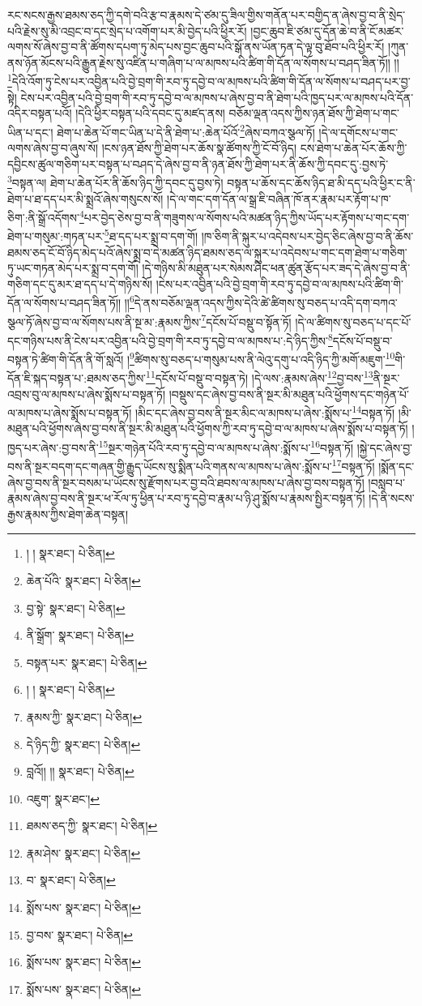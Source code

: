 རང་སངས་རྒྱས་ཐམས་ཅད་ཀྱི་དགེ་བའི་རྩ་བ་རྣམས་དེ་ཙམ་དུ་ཟིལ་གྱིས་གནོན་པར་བགྱིད་ན་ཞེས་བྱ་བ་ནི་སྲེད་པའི་རྗེས་སུ་མི་འབྲང་བ་དང་སྲེད་པ་འགོག་པར་མི་བྱེད་པའི་ཕྱིར་རོ། །བྱང་ཆུབ་ཇི་ཙམ་དུ་དོན་ཆེ་བ་ནི་ངོ་མཚར་ལགས་སོ་ཞེས་བྱ་བ་ནི་ཚོགས་དཔག་ཏུ་མེད་པས་བྱང་ཆུབ་པའི་སྒོ་ནས་ཡོན་ཏན་དེ་ལྟ་བུ་ཐོབ་པའི་ཕྱིར་རོ། །ཀུན་ནས་ཉོན་མོངས་པའི་རྒྱུན་རྗེས་སུ་འཛིན་པ་གཞིག་པ་ལ་མཁས་པའི་ཚིག་གི་དོན་ལ་སོགས་པ་བཤད་ཟིན་ཏོ།། །།\footnote{། །  སྣར་ཐང་།  པེ་ཅིན། }དེའི་འོག་ཏུ་ངེས་པར་འབྱིན་པའི་བྱེ་བྲག་གི་རབ་ཏུ་དབྱེ་བ་ལ་མཁས་པའི་ཚིག་གི་དོན་ལ་སོགས་པ་བཤད་པར་བྱ་སྟེ། ངེས་པར་འབྱིན་པའི་བྱེ་བྲག་གི་རབ་ཏུ་དབྱེ་བ་ལ་མཁས་པ་ཞེས་བྱ་བ་ནི་ཐེག་པའི་ཁྱད་པར་ལ་མཁས་པའི་དོན་འདིར་བསྟན་པའོ། །དེའི་ཕྱིར་བསྟན་པའི་དབང་དུ་མཛད་ནས། བཅོམ་ལྡན་འདས་ཀྱིས་ཉན་ཐོས་ཀྱི་ཐེག་པ་གང་ཡིན་པ་དང་། ཐེག་པ་ཆེན་པོ་གང་ཡིན་པ་དེ་ནི་ཐེག་པ་:ཆེན་པོའོ་\footnote{ཆེན་པོའི་  སྣར་ཐང་།  པེ་ཅིན། }ཞེས་བཀའ་སྩལ་ཏོ། །དེ་ལ་དགོངས་པ་གང་ལགས་ཞེས་བྱ་བ་ཞུས་སོ། །ངས་ཉན་ཐོས་ཀྱི་ཐེག་པར་ཆོས་སྣ་ཚོགས་ཀྱི་ངོ་བོ་ཉིད། ངས་ཐེག་པ་ཆེན་པོར་ཆོས་ཀྱི་དབྱིངས་ཚུལ་གཅིག་པར་བསྟན་པ་བཤད་དེ་ཞེས་བྱ་བ་ནི་ཉན་ཐོས་ཀྱི་ཐེག་པར་ནི་ཆོས་ཀྱི་དབང་དུ་:བྱས་ཏེ་\footnote{བྱ་སྟེ་  སྣར་ཐང་།  པེ་ཅིན། }བསྟན་ལ། ཐེག་པ་ཆེན་པོར་ནི་ཆོས་ཉིད་ཀྱི་དབང་དུ་བྱས་ཏེ། བསྟན་པ་ཆོས་དང་ཆོས་ཉིད་ཐ་མི་དད་པའི་ཕྱིར་ང་ནི་ཐེག་པ་ཐ་དད་པར་མི་སྨྲའོ་ཞེས་གསུངས་སོ། །དེ་ལ་གང་དག་དོན་ལ་སྒྲ་ཇི་བཞིན་ཁོ་ནར་རྣམ་པར་རྟོག་པ་ཁ་ཅིག་:ནི་སྒྲོ་འདོགས་\footnote{ནི་སྒྲོག་  སྣར་ཐང་།  པེ་ཅིན། }པར་བྱེད་ཅེས་བྱ་བ་ནི་གཟུགས་ལ་སོགས་པའི་མཚན་ཉིད་ཀྱིས་ཡོད་པར་རྟོགས་པ་གང་དག་ཐེག་པ་གསུམ་:གཏན་པར་\footnote{བསྟན་པར་  སྣར་ཐང་།  པེ་ཅིན། }ཐ་དད་པར་སྨྲ་བ་དག་གོ། །ཁ་ཅིག་ནི་སྐུར་པ་འདེབས་པར་བྱེད་ཅིང་ཞེས་བྱ་བ་ནི་ཆོས་ཐམས་ཅད་ངོ་བོ་ཉིད་མེད་པའོ་ཞེས་སྨྲ་བ་དེ་མཚན་ཉིད་ཐམས་ཅད་ལ་སྐུར་པ་འདེབས་པ་གང་དག་ཐེག་པ་གཅིག་ཏུ་ཡང་གཏན་མེད་པར་སྨྲ་བ་དག་གོ། །དེ་གཉིས་མི་མཐུན་པར་སེམས་ཤིང་ཕན་ཚུན་རྩོད་པར་ཟད་དེ་ཞེས་བྱ་བ་ནི་གཅིག་དང་དུ་མར་ཐ་དད་པ་དེ་གཉིས་སོ། །ངེས་པར་འབྱིན་པའི་བྱེ་བྲག་གི་རབ་ཏུ་དབྱེ་བ་ལ་མཁས་པའི་ཚིག་གི་དོན་ལ་སོགས་པ་བཤད་ཟིན་ཏོ།། །།\footnote{། །  སྣར་ཐང་།  པེ་ཅིན། }དེ་ནས་བཅོམ་ལྡན་འདས་ཀྱིས་དེའི་ཚེ་ཚིགས་སུ་བཅད་པ་འདི་དག་བཀའ་སྩལ་ཏོ་ཞེས་བྱ་བ་ལ་སོགས་པས་ནི་སྔ་མ་:རྣམས་ཀྱིས་\footnote{རྣམས་ཀྱི་  སྣར་ཐང་།  པེ་ཅིན། }དངོས་པོ་བསྡུ་བ་སྟོན་ཏོ། །དེ་ལ་ཚིགས་སུ་བཅད་པ་དང་པོ་དང་གཉིས་པས་ནི་ངེས་པར་འབྱིན་པའི་བྱེ་བྲག་གི་རབ་ཏུ་དབྱེ་བ་ལ་མཁས་པ་:དེ་ཉིད་ཀྱིས་\footnote{དེ་ཉིད་ཀྱི་  སྣར་ཐང་།  པེ་ཅིན། }དངོས་པོ་བསྡུ་བ་བསྟན་ཏེ་ཚིག་གི་དོན་ནི་གོ་སླའོ། །\footnote{བླའོ།། །།  སྣར་ཐང་།  པེ་ཅིན། }ཚིགས་སུ་བཅད་པ་གསུམ་པས་ནི་ལེའུ་དགུ་པ་འདི་ཉིད་ཀྱི་མགོ་མཇུག་\footnote{འཇུག་  སྣར་ཐང་། }གི་དོན་ཇི་སྐད་བསྟན་པ་:ཐམས་ཅད་ཀྱིས་\footnote{ཐམས་ཅད་ཀྱི་  སྣར་ཐང་།  པེ་ཅིན། }དངོས་པོ་བསྡུ་བ་བསྟན་ཏེ། །དེ་ལས་:རྣམས་ཞེས་\footnote{རྣམ་ཤེས་  སྣར་ཐང་།  པེ་ཅིན། }བྱ་བས་\footnote{བ་  སྣར་ཐང་།  པེ་ཅིན། }ནི་སྔར་འབྲས་བུ་ལ་མཁས་པ་ཞེས་སྨོས་པ་བསྟན་ཏོ། །བསྡུས་དང་ཞེས་བྱ་བས་ནི་སྔར་མི་མཐུན་པའི་ཕྱོགས་དང་གཉེན་པོ་ལ་མཁས་པ་ཞེས་སྨོས་པ་བསྟན་ཏོ། །མིང་དང་ཞེས་བྱ་བས་ནི་སྔར་མིང་ལ་མཁས་པ་ཞེས་:སྨོས་པ་\footnote{སྨོས་པས་  སྣར་ཐང་།  པེ་ཅིན། }བསྟན་ཏོ། །མི་མཐུན་པའི་ཕྱོགས་ཞེས་བྱ་བས་ནི་སྔར་མི་མཐུན་པའི་ཕྱོགས་ཀྱི་རབ་ཏུ་དབྱེ་བ་ལ་མཁས་པ་ཞེས་སྨོས་པ་བསྟན་ཏོ། །ཁྱད་པར་ཞེས་:བྱ་བས་ནི་\footnote{བྱ་བས་  སྣར་ཐང་།  པེ་ཅིན། }སྔར་གཉེན་པོའི་རབ་ཏུ་དབྱེ་བ་ལ་མཁས་པ་ཞེས་:སྨོས་པ་\footnote{སྨོས་པས་  སྣར་ཐང་།  པེ་ཅིན། }བསྟན་ཏོ། །སྐྱེ་དང་ཞེས་བྱ་བས་ནི་སྔར་བདག་དང་གཞན་གྱི་རྒྱུད་ཡོངས་སུ་སྨིན་པའི་གནས་ལ་མཁས་པ་ཞེས་:སྨོས་པ་\footnote{སྨོས་པས་  སྣར་ཐང་།  པེ་ཅིན། }བསྟན་ཏོ། །སྨོན་དང་ཞེས་བྱ་བས་ནི་སྔར་བསམ་པ་ཡོངས་སུ་རྫོགས་པར་བྱ་བའི་ཐབས་ལ་མཁས་པ་ཞེས་བྱ་བས་བསྟན་ཏོ། །བསླབ་པ་རྣམས་ཞེས་བྱ་བས་ནི་སྔར་ཕ་རོལ་ཏུ་ཕྱིན་པ་རབ་ཏུ་དབྱེ་བ་རྣམ་པ་ཉི་ཤུ་སྨོས་པ་རྣམས་སྤྱིར་བསྟན་ཏོ། །དེ་ནི་སངས་རྒྱས་རྣམས་ཀྱིས་ཐེག་ཆེན་བསྟན། 